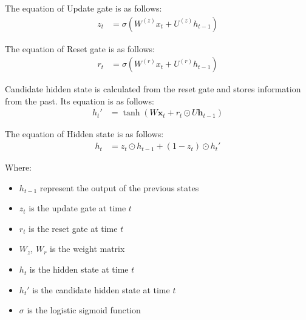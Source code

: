 \documentclass{ieeeojies}
\begin{document}
The equation of Update gate is as follows:
\begin{align*}
z_t &= \sigma\left( W^{(z)} x_t + U^{(z)} h_{t-1} \right)
\end{align*}

The equation of Reset gate is as follows:
\begin{align*}
r_t &= \sigma\left( W^{(r)} x_t + U^{(r)} h_{t-1} \right)
\end{align*}

Candidate hidden state is calculated from the reset gate and stores information from the past. Its equation is as follows:
\begin{align*}
h_t' &= \tanh(W \mathbf{x}_t + r_t \odot U \mathbf{h}_{t-1})
\end{align*}

The equation of Hidden state is as follows:
\begin{align*}
h_t &= z_t \odot h_{t-1} + (1 - z_t) \odot h_t'  
\end{align*}

Where:\\
    \begin{itemize}
        \item \(h_{t-1}\) represent the output of the previous states
        \item \(z_t\) is the update gate at time \(t\)
        \item \(r_t\) is the reset gate at time \(t\)
        \item \(W_z\), \(W_r\) is the weight matrix
        \item \(h_t\) is the hidden state at time \(t\)
        \item \(h_t'\) is the candidate hidden state at time \(t\)
        \item \(\sigma\) is the logistic sigmoid function \cite{gru_equation}
    \end{itemize}
\end{document}
